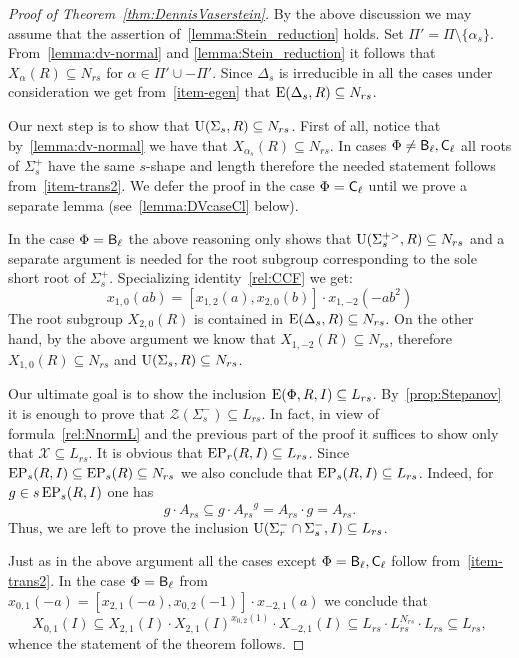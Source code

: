 \begin{proof}[Proof of Theorem~\ref{thm:DennisVaserstein}]
By the above discussion we may assume that the assertion of~\cref{lemma:Stein_reduction} holds.
Set $\Pi' = \Pi \setminus \{\alpha_s\}$.
From~\cref{lemma:dv-normal} and \cref{lemma:Stein_reduction} it follows that $X_\alpha(R) \subseteq N_{rs}$ for $\alpha \in \Pi' \cup -\Pi'$.
Since $\Delta_s$ is irreducible in all the cases under consideration we get from~\cref{item-egen} that $\operatorname{E}(\Delta_s, R) \subseteq N_{rs}$.

Our next step is to show that $\operatorname{U}(\Sigma_s, R) \subseteq N_{rs}$.
First of all, notice that by~\cref{lemma:dv-normal} we have that $X_{\alpha_s}(R) \subseteq N_{rs}$.
In cases $\Phi\neq \mathsf{B}_\ell, \mathsf{C}_\ell$ all roots of $\Sigma^+_s$ have the same $s$-shape and length therefore the needed statement follows from~\cref{item-trans2}.
We defer the proof in the case $\Phi=\mathsf{C}_\ell$ until we prove a separate lemma (see~\cref{lemma:DVcaseCl} below).

In the case $\Phi=\mathsf{B}_\ell$ the above reasoning only shows that $\operatorname{U}(\Sigma_s^{+>}, R) \subseteq N_{rs}$ and a separate argument is needed for the root subgroup corresponding to the sole short root of $\Sigma_s^+$.
Specializing identity~\eqref{rel:CCF} we get:
\begin{equation*} \label{rel:CCF-specBC} x_{1,0}(ab) = [x_{1, 2}(a), x_{2, 0}(b)] \cdot x_{1,-2}(-a b^2) \end{equation*}
The root subgroup $X_{2, 0}(R)$ is contained in $\operatorname{E}(\Delta_s, R) \subseteq N_{rs}$.
On the other hand, by the above argument we know that $X_{1,-2}(R) \subseteq N_{rs}$, therefore $X_{1,0}(R) \subseteq N_{rs}$ and $\operatorname{U}(\Sigma_s, R) \subseteq N_{rs}$.

Our ultimate goal is to show the inclusion $\operatorname{E}(\Phi, R, I) \subseteq L_{rs}$. 
By~\cref{prop:Stepanov} it is enough to prove that $\mathcal{Z}(\Sigma^-_s) \subseteq L_{rs}$.
In fact, in view of formula~\eqref{rel:NnormL} and the previous part of the proof it suffices to show only that $\mathcal{X} \subseteq L_{rs}$.
It is obvious that $\operatorname{EP}_r(R, I) \subseteq L_{rs}$.
Since $\operatorname{EP}_s(R, I) \subseteq \operatorname{EP}_s(R) \subseteq N_{rs}$ we also conclude that $\operatorname{EP}_s(R, I) \subseteq L_{rs}$.
Indeed, for $g \in s\operatorname{EP}_s(R,I)$ one has
\[ g \cdot A_{rs} \subseteq g \cdot {A_{rs}}^g = A_{rs} \cdot g = A_{rs}. \]
Thus, we are left to prove the inclusion $\operatorname{U}(\Sigma^-_r \cap \Sigma^-_s, I) \subseteq L_{rs}$.

Just as in the above argument all the cases except $\Phi = \mathsf{B}_\ell, \mathsf{C}_\ell$ follow from~\cref{item-trans2}.
In the case $\Phi=\mathsf{B}_\ell$ from $x_{0, 1}(-a) = [x_{2,1}(-a), x_{0, 2}(-1)]\cdot x_{-2,1}(a)$ we conclude that
$$X_{0,1}(I) \subseteq X_{2,1}(I) \cdot X_{2,1}(I)^{x_{0,2}(1)} \cdot X_{-2,1}(I) \subseteq L_{rs} \cdot L_{rs}^{N_{rs}} \cdot L_{rs} \subseteq L_{rs},$$
whence the statement of the theorem follows. \end{proof}

